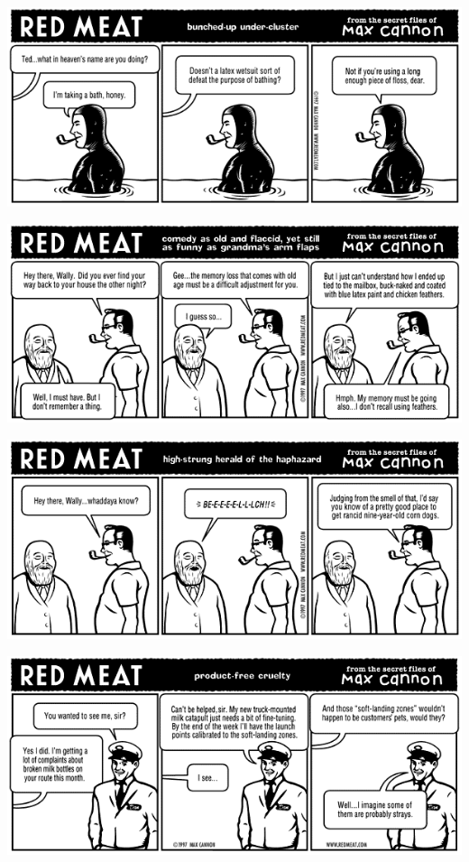\documentclass[a4paper,twoside,11pt]{article}
\begin{document}
\includegraphics[width=\textwidth]{redmeat_1997-10-27.png}



\includegraphics[width=\textwidth]{redmeat_1997-11-03.png}



\includegraphics[width=\textwidth]{redmeat_1997-11-10.png}



\includegraphics[width=\textwidth]{redmeat_1997-11-17.png}
\end{document}
